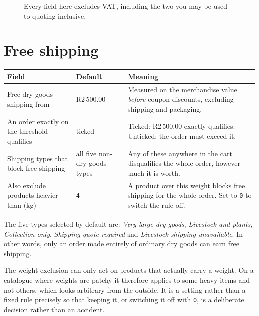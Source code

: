 \documentclass[11pt,a4paper,oneside]{report}
\newcommand{\opt}[1]{\texttt{\small #1}}
\newcommand{\R}[1]{R#1}
\newcommand{\yes}{\textsf{ticked}}
\begin{document}
\begin{figure}[H]
\centering
{}
\caption{Every field here excludes VAT, including the two you may be used to
quoting inclusive.}
\label{fig:settings-rates}
\end{figure}

\section{Free shipping}

\begin{longtable}{@{}L{5.0cm}L{2.6cm}L{7.0cm}@{}}
\toprule
\textbf{Field} & \textbf{Default} & \textbf{Meaning}\\
\midrule
\endhead
Free dry-goods shipping from & \R{2\,500.00} & Measured on the merchandise value \emph{before} coupon discounts, excluding shipping and packaging.\\
\addlinespace
An order exactly on the threshold qualifies & \yes & Ticked: \R{2\,500.00} exactly qualifies. Unticked: the order must exceed it.\\
\addlinespace
Shipping types that block free shipping & all five non-dry-goods types & Any of these anywhere in the cart disqualifies the whole order, however much it is worth.\\
\addlinespace
Also exclude products heavier than (kg) & \opt{4} & A product over this weight blocks free shipping for the whole order. Set to \opt{0} to switch the rule off.\\
\bottomrule
\end{longtable}

The five types selected by default are: \emph{Very large dry goods}, \emph{Livestock
and plants}, \emph{Collection only}, \emph{Shipping quote required} and
\emph{Livestock shipping unavailable}. In other words, only an order made entirely of
ordinary dry goods can earn free shipping.

\begin{housewarn}
The weight exclusion can only act on products that actually carry a weight. On a
catalogue where weights are patchy it therefore applies to some heavy items and not
others, which looks arbitrary from the outside. It is a setting rather than a fixed
rule precisely so that keeping it, or switching it off with \opt{0}, is a deliberate
decision rather than an accident.
\end{housewarn}
\end{document}
